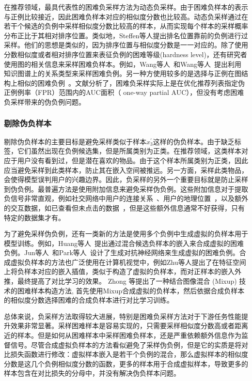 在推荐领域，最具代表性的困难负采样方法为动态负采样\cite{Zhang:2013:SIGIR}。由于困难负样本的表示与正例比较接近，因此困难负样本对应的相似度分数也比较高。动态负采样通过在若干个候选的负例中采样相似度分数比较高的样本，从而实现每个样本的采样概率分布正比于其相对排序位置。类似地，Steffen等人\cite{Steffen:2014:WSDM}提出排名位置靠前的负例进行过采样。他们的思想是类似的，因为排序位置与相似度分数是一一对应的。除了使用分数相似度或者相对排序位置来表征负例的困难等级(hardness level)，还有研究者使用图的相关信息来采样困难负样本。例如，Wang等人~\cite{Wang:2020:WWW}和Wang等人~\cite{Wang:2021:CIKM}提出利用知识图谱上的关系类型来采样困难负例。另一种方使用较多的是选择与正例在图结构上相似的困难负例~\cite{Chen:2019:WWW,Wang:2021:TKDE,Ying:2018:KDD}。文献\cite{shi2023theories}分析了，困难负采样实际上是在优化推荐列表指定伪正例例率（FPR）范围内的AUC面积（ one-way partial AUC），但没有考虑困难负采样带来的伪负例问题。

\subsubsection{剔除伪负样本}
剔除伪负样本的主要目标是避免采样类似于样本$x_3^\prime$这样的伪负样本。由于缺乏标签，它们虽然出现在负例候选集，但是所属类别为正类。在推荐领域，这类样本对应于用户没有看到过，但是潜在喜欢的物品。由于这个样本所属类别为正类，因此应当避免采样到此类样本，防止其在嵌入空间被推远。另一方面，采样此类物品，会使得模型误判用户的兴趣边界。因此，负采样的另外一个重要目标就是防止采样到伪负例。最普遍方法是使用附加信息来避免采样伪负例。这些附加信息对于提取负信号非常直观，例如社交网络中用户的连接关系~\cite{Zhao:2014:CIKM,Wang:2016:CIKM}、用户的地理位置~\cite{Yuan:2016:IJCAI,Liu:2019:IJCAI}，以及额外的交互数据，如已查看但未点击的数据~\cite{Jingtao:2019:IJCAI, Jingtao:2018:WWW}，但是这些额外信息通常不好获得，只有特定的数据集才有。

为了避免采样伪负例，还有一类新的方法是使用多个负例中生成虚拟的负样本用于模型训练。例如，Huang等人~\cite{Huang:2021:KDD}提出通过混合候选负样本的嵌入来合成虚拟的困难负例。Jun等人~\cite{Jun:2017:SIGIR}和Park等人~\cite{Park:2019:WWW}设计了生成对抗神经网络来生成虚拟的困难负例。合成虚拟负样本的方法也广泛使用在计算机视觉中，例如Zhu等人\cite{zhu:2021:iccv}提出了在特征空间上将负样本对应的嵌入插值，类似于构造了虚拟的负样本，而对正样本的嵌入外推，最终提高了对比学习的效果。 Zhong 等\cite{zhong:2021:cvpr}提出了一种结合图像混合 (Mixup) 技术的困难样本构造方法, 首先使用Mixup合成虚拟的负样本，然后依据合成负样本的相似度分数选择困难的合成负样本进行对比学习训练。

总体来说，负采样方法取得较大进展，特别是困难负采样方法对于下游任务性能提升效果非常显著。采样困难样本是容易实现的，只需要采样相似度分数高或者距离近的样本。但是如何从困难样本中采样困难负样本，还是严重依赖额外信息作为监督信号。尽管合成虚拟负样本的方法看似避免了采样伪负例，但是它的实质是将对比损失函数进行修改：虚拟样本嵌入是若干个负例的混合，那么虚拟样本的相似度分数是这几个负例相似度分数的函数，更多的样本用于合成虚拟样本，导致更多的样本包含在对比损失的分母中，并没有解决伪负样本问题。
